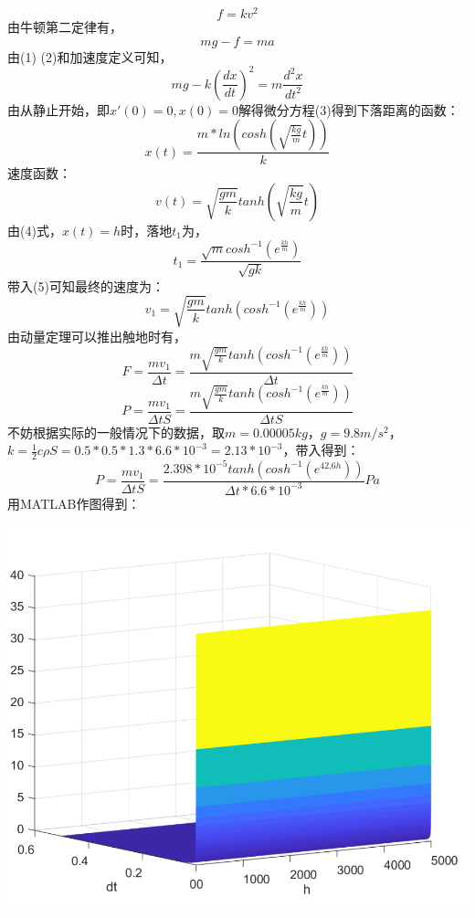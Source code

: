 \documentclass[a4paper,AutoFakeBold,AutoFakeSlant]{ctexart}
\begin{document}
\begin{equation}
  f = kv^2
\end{equation}
由牛顿第二定律有，
\begin{equation}
  mg - f = ma
\end{equation}
由(1) (2)和加速度定义可知，
\begin{equation}
  mg - k(\frac{dx}{dt})^2 = m\frac{d^2 x}{dt^2}
\end{equation}
由从静止开始，即$ x'(0) = 0, x(0) = 0 $解得微分方程(3)得到下落距离的函数：
\begin{equation}
  x(t) = \frac{m*ln(cosh(\sqrt{\frac{kg}{m}}t))}{k}
\end{equation}
速度函数：
\begin{equation}
  v(t) = \sqrt{\frac{gm}{k}} tanh(\sqrt{\frac{kg}{m}}t)
\end{equation}
由(4)式，$ x(t) = h $时，落地$t_1$为，
\begin{equation}
  t_1 = \frac{\sqrt{m} cosh^{-1}(e^{\frac{kh}{m}})}{\sqrt{gk}}
\end{equation}
带入(5)可知最终的速度为：
\begin{equation}
  v_1 = \sqrt{\frac{gm}{k}} tanh(cosh^{-1}(e^{\frac{kh}{m}}))
\end{equation}
由动量定理可以推出触地时有，
\begin{equation}
  F = \frac{mv_1}{\Delta t} = \frac{m\sqrt{\frac{gm}{k}} tanh(cosh^{-1}(e^{\frac{kh}{m}}))}{\Delta t}
\end{equation}
\begin{equation}
  P = \frac{mv_1}{\Delta t S} = \frac{m\sqrt{\frac{gm}{k}} tanh(cosh^{-1}(e^{\frac{kh}{m}}))}{\Delta t S}
\end{equation}
不妨根据实际的一般情况下的数据，取$ m = 0.00005 kg $，$ g = 9.8 m/s^2 $，$ k = \frac{1}{2}c\rho S = 0.5*0.5*1.3*6.6*10^{-3} = 2.13*10^{-3} $，带入得到：
\begin{equation}
  P = \frac{mv_1}{\Delta tS} = \frac{2.398*10^{-5} tanh(cosh^{-1}(e^{42.6h}))}{\Delta t * 6.6*10^{-3}} Pa
\end{equation}
用\textsc{MATLAB}作图得到：
\begin{center}
\includegraphics[scale=0.3]{1.png}
\end{center}
\end{document}
